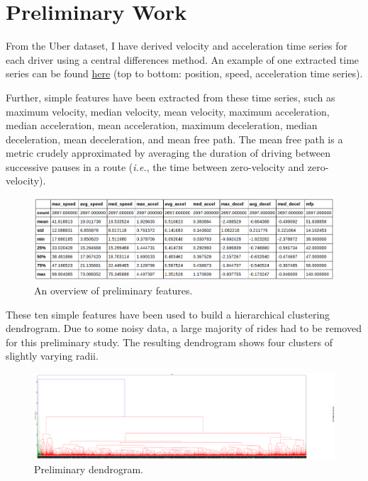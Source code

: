 \documentclass[12pt]{article}
\begin{document}
\section{Preliminary Work}

From the Uber dataset, I have derived velocity and acceleration time series for each driver using a central differences method. An example of one extracted time series can be found \href{https://b7097c28bb33c303afec66e136e388566fb53b52.googledrive.com/host/0Bz6ioWtHYtNJVjJacklTdHQ2cGM/}{here} (top to bottom: position, speed, acceleration time series).

Further, simple features have been extracted from these time series, such as maximum velocity, median velocity, mean velocity, maximum acceleration, median acceleration, mean acceleration, maximum deceleration, median deceleration, mean deceleration, and mean free path. The mean free path is a metric crudely approximated by averaging the duration of driving between successive pauses in a route (\textit{i.e.}, the time between zero-velocity and zero-velocity).

\begin{figure}[hbtp]
\caption{\label{fig:features}An overview of preliminary features.}
\begin{center}
\includegraphics[width=5.5in]{feature_describe.png}
\end{center}
\end{figure}

These ten simple features have been used to build a hierarchical clustering dendrogram. Due to some noisy data, a large majority of rides had to be removed for this preliminary study. The resulting dendrogram shows four clusters of slightly varying radii.

\begin{figure}[hbtp]
\caption{\label{fig:dendrogram}Preliminary dendrogram.}
\begin{center}
\includegraphics[width=5.5in]{dendro.png}
\end{center}
\end{figure}
\end{document}

